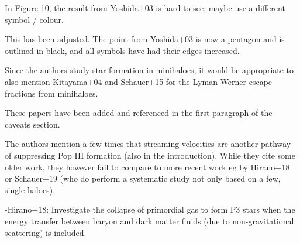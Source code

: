 \documentclass[11pt]{article}
\newenvironment{referee}[1][]{%
    \ignorespaces%
    \begin{mdframed}[style=myquotestyle,#1]%
}{%
    \end{mdframed}%
    \ignorespacesafterend%
}%
\begin{document}
\begin{referee}
In Figure 10, the result from Yoshida+03 is hard to see, maybe use a different symbol / colour.
\end{referee}
This has been adjusted. The point from Yoshida+03 is now a pentagon and is outlined in black, and all symbols have had their edges increased.

\begin{referee}
Since the authors study star formation in minihaloes, it would be appropriate to also mention Kitayama+04 and Schauer+15 for the Lyman-Werner escape fractions from minihaloes.
\end{referee}
These papers have been added and referenced in the first paragraph of the caveats section. 

\begin{referee}
The authors mention a few times that streaming velocities are another pathway of suppressing Pop III formation (also in the introduction). While they cite some older work, they however fail to compare to more recent work eg by Hirano+18 or Schauer+19 (who do perform a systematic study not only based on a few, single haloes).
\end{referee}
-Hirano+18: Investigate the collapse of primordial gas to form P3 stars when the energy transfer between baryon and dark matter fluids (due to non-gravitational scattering) is included.
\end{document}
